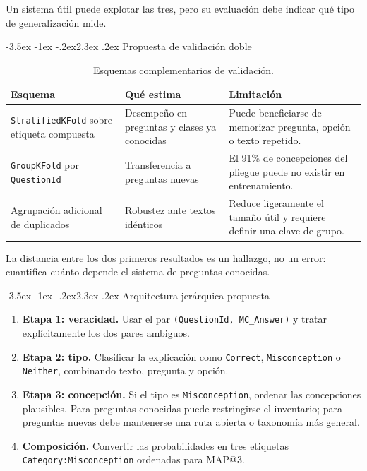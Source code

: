 \documentclass[11pt,oneside,openany]{book}
\makeatletter
\renewcommand\section{\@startsection{section}{1}{\z@}%
  {-3.5ex \@plus -1ex \@minus -.2ex}{2.3ex \@plus .2ex}%
  {\normalfont\Large\sffamily\bfseries\color{AzulMedio}}}
\newcommand{\codigo}[1]{\texttt{#1}}
\makeatother
\begin{document}
Un sistema útil puede explotar las tres, pero su evaluación debe indicar qué
tipo de generalización mide.

\section{Propuesta de validación doble}

\begin{table}[htbp]
\centering
\caption{Esquemas complementarios de validación.}
\label{tab:validacion}
\begin{tabularx}{\textwidth}{@{}p{3.4cm}p{3.6cm}Y@{}}
\toprule
\textbf{Esquema} & \textbf{Qué estima} & \textbf{Limitación}\\
\midrule
\codigo{StratifiedKFold} sobre etiqueta compuesta & Desempeño en preguntas y
clases ya conocidas & Puede beneficiarse de memorizar pregunta, opción o texto
repetido.\\
\codigo{GroupKFold} por \codigo{QuestionId} & Transferencia a preguntas nuevas
& El 91\% de concepciones del pliegue puede no existir en entrenamiento.\\
Agrupación adicional de duplicados & Robustez ante textos idénticos & Reduce
ligeramente el tamaño útil y requiere definir una clave de grupo.\\
\bottomrule
\end{tabularx}
\end{table}

La distancia entre los dos primeros resultados es un hallazgo, no un error:
cuantifica cuánto depende el sistema de preguntas conocidas.

\section{Arquitectura jerárquica propuesta}

\begin{enumerate}
  \item \textbf{Etapa 1: veracidad.} Usar el par
        \codigo{(QuestionId, MC\_Answer)} y tratar explícitamente los dos pares
        ambiguos.
  \item \textbf{Etapa 2: tipo.} Clasificar la explicación como
        \codigo{Correct}, \codigo{Misconception} o \codigo{Neither}, combinando
        texto, pregunta y opción.
  \item \textbf{Etapa 3: concepción.} Si el tipo es
        \codigo{Misconception}, ordenar las concepciones plausibles. Para
        preguntas conocidas puede restringirse el inventario; para preguntas
        nuevas debe mantenerse una ruta abierta o taxonomía más general.
  \item \textbf{Composición.} Convertir las probabilidades en tres etiquetas
        \codigo{Category:Misconception} ordenadas para MAP@3.
\end{enumerate}
\end{document}
